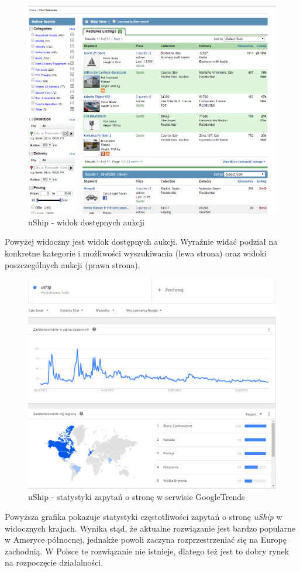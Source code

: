 \documentclass[10pt,titlepage]{article} %
\begin{document}
\begin{figure}[H]
\includegraphics[width=\textwidth, scale=0.6]{img/sekcja1/uship}
\caption[uShip - widok dostępnych aukcji]{uShip - widok dostępnych aukcji\cite{uship}}
\end{figure}
Powyżej widoczny jest widok dostępnych aukcji. Wyraźnie widać podział na konkretne kategorie i możliwości wyszukiwania (lewa strona) oraz widoki poszczególnych aukcji (prawa strona).

\begin{figure}[H]
\includegraphics[width=\textwidth]{img/sekcja1/uship1}
\caption[uShip - statystyki zapytań o stronę w serwisie GoogleTrends]{uShip - statystyki zapytań o stronę w serwisie GoogleTrends\cite{googleTrends}}
\end{figure}
Powyższa grafika pokazuje statystyki częstotliwości zapytań o stronę \textit{uShip} w widocznych krajach. Wynika stąd, że
aktualne rozwiązanie jest bardzo popularne w Ameryce północnej, jednakże powoli zaczyna rozprzestrzeniać się na Europę zachodnią. W Polsce te rozwiązanie nie istnieje, dlatego też jest to dobry rynek na rozpoczęcie działalności.
\end{document}
